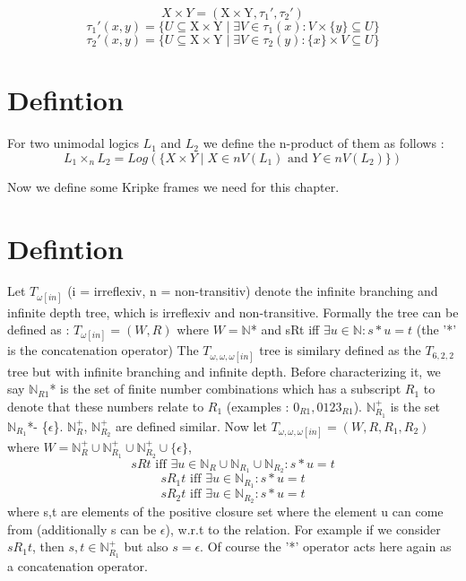 \documentclass[12pt, a4paper]{scrreprt}
\begin{document}
$$ X \times Y = (\mbox{X} \times \mbox{Y}, \tau_1', \tau_2')$$   
$$ \tau_1'(x,y) = \{ U \subseteq \mbox{X} \times \mbox{Y} \mid \exists V \in \tau_1(x) : V \times  \{ y \} \subseteq U \}$$
$$ \tau_2'(x,y) = \{ U \subseteq \mbox{X} \times \mbox{Y} \mid \exists V \in \tau_2(y) : \{ x \} \times V \subseteq U \}$$

\section {Defintion}

For two unimodal logics $L_1$ and $L_2$ we define the n-product of them as follows :
$$ L_1 \times_n L_2 = Log(\{ X \times Y \mid X \in nV(L_1) \mbox{ and } Y \in nV(L_2) \})$$

Now we define some Kripke frames we need for this chapter.


\section{Defintion}
Let $T_{\omega [in]}$ (i = irreflexiv, n = non-transitiv) denote the infinite branching and infinite depth tree, which is irreflexiv and non-transitive.
Formally the tree can be defined as : $T_{\omega [in]} = (W, R)$ where $W = \mathbb{N}$* and sRt iff $\exists u \in \mathbb{N} : s*u = t$ (the '*' is the concatenation operator) \newline \newline
The $T_{\omega,\omega,\omega [in]}$ tree is similary defined as the $T_{6,2,2}$ tree but with infinite branching and infinite depth. Before characterizing it, we say
$\mathbb{N}_{R1}$* is the set of finite number combinations which has a subscript $R_1$ to denote that these numbers relate to $R_1$  \newline 
(examples : $0_{R1}, 0123_{R1}$).
$\mathbb{N}^+_{R_1}$ is the set $\mathbb{N}_{R_1}$*- \{$\epsilon$\}. $\mathbb{N}^+_{R}$, $\mathbb{N}^+_{R_2}$ are defined similar. \newline \newline
Now let $T_{\omega,\omega,\omega [in]} = (W, R, R_1, R_2 )$ where $W = \mathbb{N}^+_{R} \cup \mathbb{N}^+_{R_1} \cup \mathbb{N}^+_{R_2} \cup \{ \epsilon\}$, 
$$sRt \mbox{ iff } \exists u \in \mathbb{N}_{R} \cup \mathbb{N}_{R_1} \cup \mathbb{N}_{R_2} : s*u = t$$
$$sR_1t \mbox { iff } \exists u \in \mathbb{N}_{R_1} : s * u = t$$
$$sR_2t \mbox { iff } \exists u \in \mathbb{N}_{R_2} : s * u = t$$
where s,t are elements of the positive closure set where the element u can come from (additionally s can be $\epsilon$), w.r.t to the relation. For example
if we consider $sR_1t$, then $s,t \in \mathbb{N}^+_{R_1}$ but also $s = \epsilon$. Of course the '*' operator acts here again as a concatenation operator.
\end{document}
